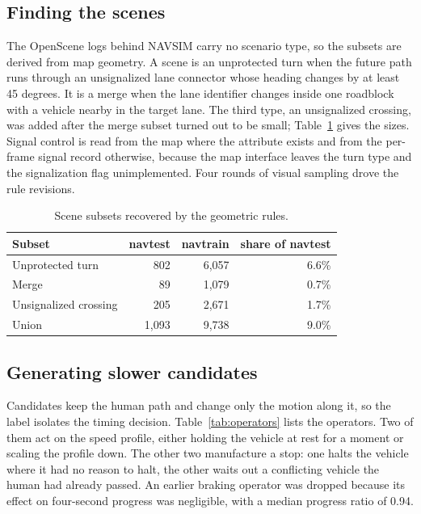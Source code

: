 \documentclass[conference]{IEEEtran}
\begin{document}
\subsection{Finding the scenes}
The OpenScene logs behind NAVSIM carry no scenario type, so the subsets are
derived from map geometry. A scene is an unprotected turn when the future path
runs through an unsignalized lane connector whose heading changes by at least
45 degrees. It is a merge when the lane identifier changes inside one roadblock
with a vehicle nearby in the target lane. The third type, an unsignalized
crossing, was added after the merge subset turned out to be small;
Table~\ref{tab:subsets} gives the sizes. Signal control is read from the map
where the attribute exists and from the per-frame signal record otherwise,
because the map interface leaves the turn type and the signalization flag
unimplemented. Four rounds of visual sampling drove the rule revisions.

\begin{table}[t]
\caption{Scene subsets recovered by the geometric rules.}
\label{tab:subsets}
\centering
\footnotesize
\begin{tabular}{@{}lrrr@{}}
\toprule
Subset & navtest & navtrain & share of navtest \\
\midrule
Unprotected turn      & 802   & 6{,}057 & 6.6\% \\
Merge                 & 89    & 1{,}079 & 0.7\% \\
Unsignalized crossing & 205   & 2{,}671 & 1.7\% \\
\midrule
Union                 & 1{,}093 & 9{,}738 & 9.0\% \\
\bottomrule
\end{tabular}
\end{table}

\subsection{Generating slower candidates}
Candidates keep the human path and change only the motion along it, so the
label isolates the timing decision. Table~\ref{tab:operators} lists the
operators. Two of them act on the speed profile, either holding the vehicle at
rest for a moment or scaling the profile down. The other two manufacture a
stop: one halts the vehicle where it had no reason to halt, the other waits out
a conflicting vehicle the human had already passed. An earlier braking operator was dropped
because its effect on four-second progress was negligible, with a median
progress ratio of 0.94.
\end{document}
